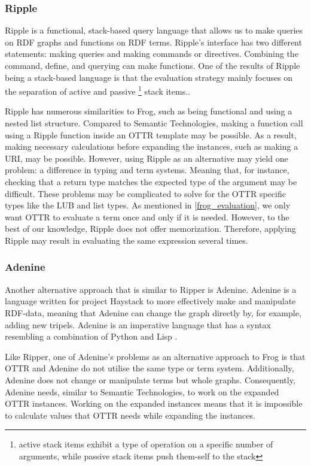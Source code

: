 \subsubsection{Ripple}
Ripple is a functional, stack-based query language that allows us to make queries on RDF graphs and functions on RDF terms. Ripple's interface has two different statements: making queries and making commands or directives. Combining the command, define, and querying can make functions. One of the results of Ripple being a stack-based language is that the evaluation strategy mainly focuses on the separation of active and passive \footnote{active stack items exhibit a type of operation on a specific number of arguments, while passive stack items push them-self to the stack} stack items.\autocite{ShinavierJoshua_FPLD}.

\para
Ripple has numerous similarities to Frog, such as being functional and using a nested list structure. Compared to Semantic Technologies, making a function call using a Ripple function inside an OTTR template may be possible. As a result, making necessary calculations before expanding the instances, such as making a URI, may be possible. However, using Ripple as an alternative may yield one problem: a difference in typing and term systems. Meaning that, for instance, checking that a return type matches the expected type of the argument may be difficult. These problems may be complicated to solve for the OTTR specific types like the LUB and list types.  As mentioned in \autoref{frog_evaluation}, we only want OTTR to evaluate a term once and only if it is needed. However, to the best of our knowledge, Ripple does not offer memorization. Therefore, applying Ripple may result in evaluating the same expression several times.   

\subsubsection{Adenine}
Another alternative approach that is similar to Ripper is Adenine. Adenine is a language written for project Haystack to more effectively make and manipulate RDF-data, meaning that Adenine can change the graph directly by, for example, adding new tripels. Adenine is an imperative language that has a syntax resembling a combination of Python and Lisp \autocite{Adenine}.

\para
Like Ripper, one of Adenine's problems as an alternative approach to Frog is that OTTR and Adenine do not utilise the same type or term system. Additionally, Adenine does not change or manipulate terms but whole graphs. Consequently, Adenine needs, similar to Semantic Technologies, to work on the expanded OTTR instances. Working on the expanded instances means that it is impossible to calculate values that OTTR needs while expanding the instances. 

